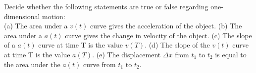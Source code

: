 Decide whether the following statements are true or false regarding
one-dimensional motion:\\
%
(a) The area under a $v(t)$ curve gives the acceleration of the
object.\hwendpart
%
(b) The area under a $a(t)$ curve gives the change in velocity of the
object.\hwendpart
%
(c) The slope of a $a(t)$ curve at time T is the value
$v(T)$.\hwendpart
%
(d) The slope of the $v(t)$ curve at time T is the value
$a(T)$.\hwendpart
%
(e) The displacement $\Delta x$ from $t_1$ to $t_2$ is equal to the
area under the $a(t)$ curve from $t_1$ to $t_2$.

